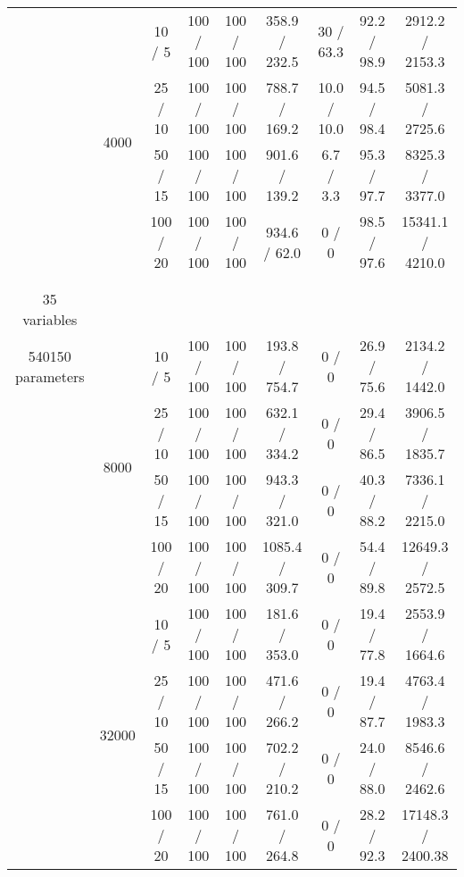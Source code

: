 \documentclass[twoside,11pt]{article}
\begin{document}
\begin{table}[H]
\begin{tabular}{  c | c | c || c | c | c || c | c | c }
\hhline {~|-|-||-|-|-||-|-|-}

& \multirow{4}{*}{4000}
& 10 / 5 & 100 / 100 & 100 / 100 & 358.9 / 232.5 & \cellcolor{yellow!100} 30 / 63.3 & \cellcolor{yellow!100} 92.2 / 98.9 & 2912.2 / 2153.3  \\
& & 25 / 10 & 100 / 100  & 100 / 100 & 788.7 / 169.2 & \cellcolor{yellow!100} 10.0 / 10.0 & \cellcolor{yellow!100} 94.5 / 98.4 & 5081.3 / 2725.6 \\
& & 50 / 15 & 100 / 100 & 100 / 100  & 901.6 / 139.2  & \cellcolor{yellow!100} 6.7 / 3.3 & \cellcolor{yellow!100} 95.3 / 97.7 & 8325.3 / 3377.0  \\
& & 100 / 20 & 100 / 100 & 100 / 100 & 934.6 / 62.0 & \cellcolor{yellow!100} 0 / 0 & \cellcolor{yellow!100} 98.5 / 97.6 & 15341.1 / 4210.0 \\

\hhline{=|=|=||=|=|=|=|=|=}
\multirow{8}{*}{\thead{\textbf{mildew} \\ \\ 35 variables \\ 540150 parameters}} & \multirow{4}{*}{8000} 

& 10 / 5 & 100 / 100 & 100 / 100 & 193.8 / 754.7 & \cellcolor{yellow!100} 0 / 0 & \cellcolor{yellow!100} 26.9 / 75.6 & 2134.2 / 1442.0  \\
& & 25 / 10 & 100 / 100  & 100 / 100 & 632.1 / 334.2 & \cellcolor{yellow!100} 0 / 0 & \cellcolor{yellow!100} 29.4 / 86.5 & 3906.5 / 1835.7 \\
& & 50 / 15 & 100 / 100 & 100 / 100  & 943.3 / 321.0 & \cellcolor{yellow!100} 0 / 0 & \cellcolor{yellow!100} 40.3 / 88.2 & 7336.1 / 2215.0  \\
& & 100 / 20 & 100 / 100 & 100 / 100 & 1085.4 / 309.7 & \cellcolor{yellow!100} 0 / 0 & \cellcolor{yellow!100} 54.4 / 89.8 & 12649.3 / 2572.5 \\

\hhline {~|-|-||-|-|-||-|-|-}
& \multirow{4}{*}{32000}
& 10 / 5 & 100 / 100 & 100 / 100 & 181.6 / 353.0  & \cellcolor{yellow!100} 0 / 0 & \cellcolor{yellow!100} 19.4 / 77.8 & 2553.9 / 1664.6  \\
& & 25 / 10 & 100 / 100  & 100 / 100 & 471.6 / 266.2 & \cellcolor{yellow!100} 0 / 0 & \cellcolor{yellow!100} 19.4 / 87.7 & 4763.4 / 1983.3 \\
& & 50 / 15 & 100 / 100 & 100 / 100  & 702.2 / 210.2 & \cellcolor{yellow!100} 0 / 0 & \cellcolor{yellow!100} 24.0 / 88.0 & 8546.6 / 2462.6  \\
& & 100 / 20 & 100 / 100 & 100 / 100 & 761.0 / 264.8 & \cellcolor{yellow!100} 0 / 0 & \cellcolor{yellow!100} 28.2 / 92.3 & 17148.3 / 2400.38 \\


\end{tabular}
\end{table}
\end{document}
